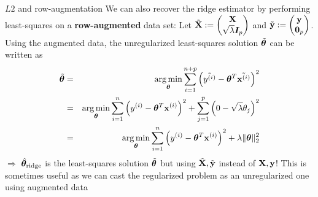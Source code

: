 \documentclass[11pt,compress,t,notes=noshow, xcolor=table]{beamer}
\begin{document}
\begin{vbframe}{$L2$ and row-augmentation}
We can also recover the ridge estimator by performing least-squares on a \textbf{row-augmented} data set: Let $\tilde{\mathbf{X}}:= \begin{pmatrix} \mathbf{X} \\ \sqrt{\lambda} \boldsymbol{I}_{p} \end{pmatrix}$ and $\tilde{\mathbf{y}} := \begin{pmatrix}
    \mathbf{y} \\ \bm{0}_{p}
\end{pmatrix}$. Using the augmented data, the unregularized least-squares solution $\tilde{\bm{\theta}}$ can be written as
{\small
\begin{eqnarray*}
\tilde{\thetab} &=& \argmin_{\thetab} 
\sum_{i=1}^{n+p} \left(\tilde{\yi} - \thetab^T \tilde{\xi} \right)^2 \\ &=& \argmin_{\thetab} 
\sum_{i=1}^{n} \left(\yi - \thetab^T \xi \right)^2 + \sum_{j=1}^{p} \left(0 - \sqrt{\lambda} \theta_j \right)^2 \\ %
&=& \argmin_{\thetab} \sumin \left(\yi - \thetab^T \xi \right)^2 + \lambda \|\thetab\|_2^2
\end{eqnarray*}
}
$\Longrightarrow$ $\hat{\bm{\theta}}_{\text{ridge}}$ is the least-squares solution $\tilde{\bm{\theta}}$ but using $\tilde{\mathbf{X}},\tilde{\mathbf{y}}$ instead of $\mathbf{X}, \mathbf{y}$!
This is sometimes useful as we can cast the regularized problem as an unregularized one using augmented data
\end{vbframe}
\end{document}

